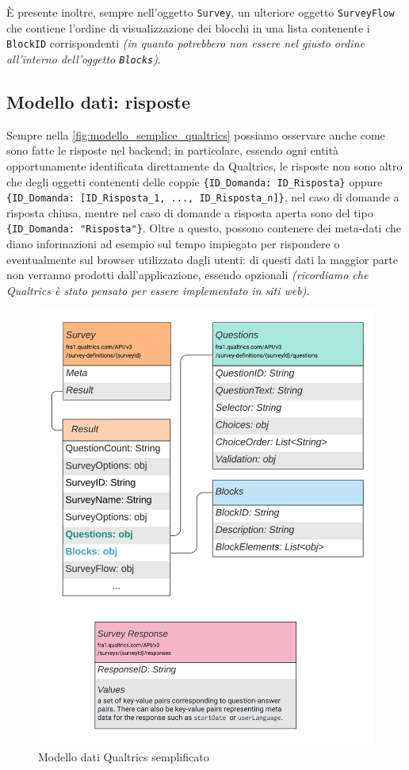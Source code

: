 È presente inoltre, sempre nell'oggetto \texttt{Survey}, un ulteriore oggetto \texttt{SurveyFlow} che contiene l'ordine di visualizzazione dei blocchi in una lista contenente i \texttt{BlockID} corrispondenti \textit{(in quanto potrebbero non essere nel giusto ordine all'interno dell'oggetto \texttt{Blocks})}.

\subsection{Modello dati: risposte}
\label{subsection:risposte}
Sempre nella \autoref{fig:modello_semplice_qualtrics} possiamo osservare anche come sono fatte le risposte nel backend; in particolare, essendo ogni entità opportunamente identificata direttamente da Qualtrics, le risposte non sono altro che degli oggetti contenenti delle coppie \texttt{\{ID\_Domanda: ID\_Risposta\}} oppure \texttt{\{ID\_Domanda: [ID\_Risposta\_1, ..., ID\_Risposta\_n]\}}, nel caso di domande a risposta chiusa, mentre nel caso di domande a risposta aperta sono del tipo \texttt{\{ID\_Domanda: "Risposta"\}}. Oltre a questo, possono contenere dei meta-dati che diano informazioni ad esempio sul tempo impiegato per rispondere o eventualmente sul browser utilizzato dagli utenti: di questi dati la maggior parte non verranno prodotti dall'applicazione, essendo opzionali \textit{(ricordiamo che Qualtrics è stato pensato per essere implementato in siti web)}.

\begin{figure}
\centering
\includegraphics[width=\textwidth]{img/modello_semplice_qualtrics}
\caption{Modello dati Qualtrics semplificato}
\label{fig:modello_semplice_qualtrics}
\end{figure}


